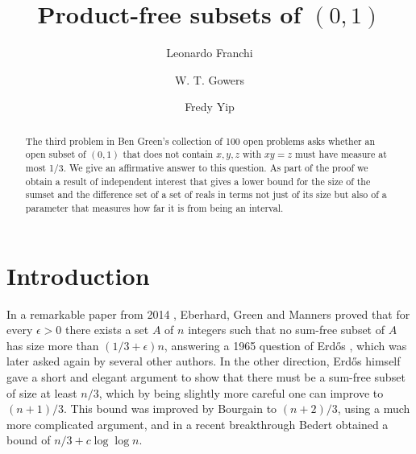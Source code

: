 \documentclass[11pt,reqno]{amsart}
\theoremstyle{definition}
\def\e{\epsilon}
\begin{document}
\title{Product-free subsets of $(0,1)$}



\author[L. Franchi]{Leonardo Franchi}
\address{Department of Pure Mathematics and Mathematical Statistics,
Centre for Mathematical Sciences, Wilberforce Road,
Cambridge CB3 0WA, United Kingdom}

\author[W. T. Gowers]{W. T. Gowers}
\address{Coll\`ege de France, 11 place Marcelin Berthelot,
75005 Paris, France and Department of Pure Mathematics and Mathematical Statistics,
Centre for Mathematical Sciences, Wilberforce Road,
Cambridge CB3 0WA, United Kingdom} 

\author[F. Yip]{Fredy Yip}
\address{Department of Pure Mathematics and Mathematical Statistics,
Centre for Mathematical Sciences, Wilberforce Road,
Cambridge CB3 0WA, United Kingdom}

\begin{abstract}
The third problem in Ben Green's collection of 100 open problems asks whether an open subset of $(0,1)$ that does not contain $x,y,z$ with $xy=z$ must have measure at most 1/3. We give an affirmative answer to this question. As part of the proof we obtain a result of independent interest that gives a lower bound for the size of the sumset and the difference set of a set of reals in terms not just of its size but also of a parameter that measures how far it is from being an interval.
\end{abstract}

\maketitle

\section{Introduction}

In a remarkable paper from 2014 \cite{EberhardGreenManners2014}, Eberhard, Green and Manners proved that for every $\e>0$ there exists a set $A$ of $n$ integers such that no sum-free subset of $A$ has size more than $(1/3+\e)n$, answering a 1965 question of Erd\H os \cite{Erdos1965}, which was later asked again by several other authors. In the other direction, Erd\H os himself gave a short and elegant argument to show that there must be a sum-free subset of size at least $n/3$, which by being slightly more careful one can improve to $(n+1)/3$. This bound was improved by Bourgain \cite{Bourgain} to $(n+2)/3$, using a much more complicated argument, and in a recent breakthrough Bedert \cite{Bedert} obtained a bound of $n/3+c\log\log n$.
\end{document}
